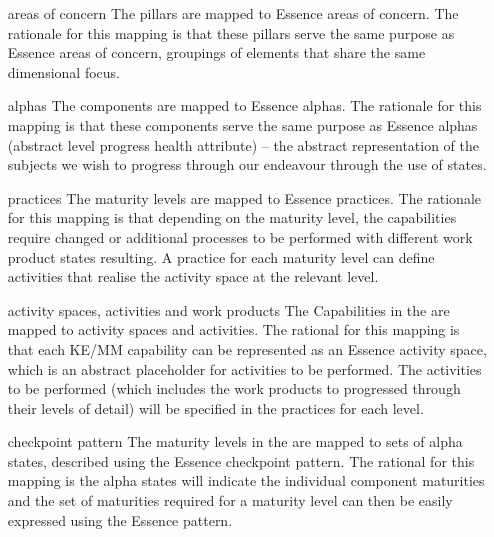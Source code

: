 \begin{itemize}[leftmargin=0.5in,font=\bfseries]

  \item [areas of concern]
  The  pillars are mapped to Essence areas of concern.
  The rationale for this mapping is that these  pillars serve the same purpose as Essence areas of concern, groupings of elements that share the same dimensional focus.

  \item [alphas]
  The  components are mapped to Essence alphas.
  The rationale for this mapping is that these  components serve the same purpose as Essence alphas (abstract level progress health attribute) – the abstract representation of the subjects we wish to progress through our endeavour through the use of states.

  \item [practices]
  The  maturity levels are mapped to Essence practices.
  The rationale for this mapping is that depending on the maturity level, the  capabilities require changed or additional processes to be performed with different work product states resulting. A practice for each maturity level can define activities that realise the activity space at the relevant level.

  \item [activity spaces, activities and work products]
  The Capabilities in the  are mapped to activity spaces and activities.
  The rational for this mapping is that each KE/MM capability can be represented as an Essence activity space, which is an abstract placeholder for activities to be performed.
  The activities to be performed (which includes the work products to progressed through their levels of detail) will be specified in the practices for each level.

  \item [checkpoint pattern]
  The maturity levels in the  are mapped to sets of alpha states, described using the Essence checkpoint pattern.
  The rational for this mapping is the alpha states will indicate the individual component maturities and the set of maturities required for a maturity level can then be easily expressed using the Essence pattern.

\end{itemize}
